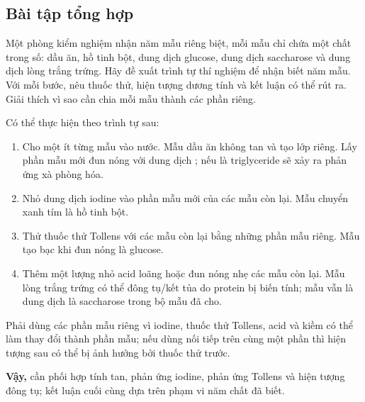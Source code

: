 \subsection{Bài tập tổng hợp}

\begin{tuluyen}
Một phòng kiểm nghiệm nhận năm mẫu riêng biệt, mỗi mẫu chỉ chứa một chất trong số: dầu ăn, hồ tinh bột, dung dịch glucose, dung dịch saccharose và dung dịch lòng trắng trứng. Hãy đề xuất trình tự thí nghiệm để nhận biết năm mẫu. Với mỗi bước, nêu thuốc thử, hiện tượng dương tính và kết luận có thể rút ra. Giải thích vì sao cần chia mỗi mẫu thành các phần riêng.
\begin{loigiaiBT}
Có thể thực hiện theo trình tự sau:
\begin{enumerate}
\item Cho một ít từng mẫu vào nước. Mẫu dầu ăn không tan và tạo lớp riêng. Lấy phần mẫu mới đun nóng với dung dịch ; nếu là triglyceride sẽ xảy ra phản ứng xà phòng hóa.
\item Nhỏ dung dịch iodine vào phần mẫu mới của các mẫu còn lại. Mẫu chuyển xanh tím là hồ tinh bột.
\item Thử thuốc thử Tollens với các mẫu còn lại bằng những phần mẫu riêng. Mẫu tạo bạc khi đun nóng là glucose.
\item Thêm một lượng nhỏ acid loãng hoặc đun nóng nhẹ các mẫu còn lại. Mẫu lòng trắng trứng có thể đông tụ/kết tủa do protein bị biến tính; mẫu vẫn là dung dịch là saccharose trong bộ mẫu đã cho.
\end{enumerate}

Phải dùng các phần mẫu riêng vì iodine, thuốc thử Tollens, acid và kiềm có thể làm thay đổi thành phần mẫu; nếu dùng nối tiếp trên cùng một phần thì hiện tượng sau có thể bị ảnh hưởng bởi thuốc thử trước.

\textbf{Vậy,} cần phối hợp tính tan, phản ứng iodine, phản ứng Tollens và hiện tượng đông tụ; kết luận cuối cùng dựa trên phạm vi năm chất đã biết.
\end{loigiaiBT}
\end{tuluyen}

